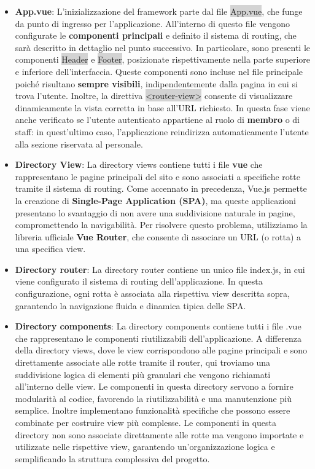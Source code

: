\begin{itemize}
	
	\item \textbf{App.vue}: L’inizializzazione del framework parte dal file \colorbox{lightgray}{App.vue}, che funge da punto di ingresso per l’applicazione. All’interno di questo file vengono configurate le \textbf{componenti principali} e definito il sistema di routing, che sarà descritto in dettaglio nel punto successivo.
	In particolare, sono presenti le componenti \colorbox{lightgray}{Header} e \colorbox{lightgray}{Footer}, posizionate rispettivamente nella parte superiore e inferiore dell’interfaccia.
	Queste componenti sono incluse nel file principale poiché risultano \textbf{sempre visibili}, indipendentemente dalla pagina in cui si trova l’utente. Inoltre, la direttiva \colorbox{lightgray}{<router-view>} consente di visualizzare dinamicamente la vista corretta in base all’URL richiesto.
	In questa fase viene anche verificato se l’utente autenticato appartiene al ruolo di \textbf{membro} o di {staff}: in quest’ultimo caso, l’applicazione reindirizza automaticamente l’utente alla sezione riservata al personale.
	
	\item \textbf{Directory View}: La directory views contiene tutti i file \textbf{vue} che rappresentano le pagine principali del sito e sono associati a specifiche rotte tramite il sistema di routing.
	Come accennato in precedenza, Vue.js permette la creazione di \textbf{Single-Page Application (SPA)}, ma queste applicazioni presentano lo svantaggio di non avere una suddivisione naturale in pagine, compromettendo la navigabilità. Per risolvere questo problema, utilizziamo la libreria ufficiale \textbf{Vue Router}, che consente di associare un URL (o rotta) a una specifica view.
	
	\item \textbf{Directory router}: La directory router contiene un unico file index.js, in cui viene configurato il sistema di routing dell’applicazione. In questa configurazione, ogni rotta è associata alla rispettiva view descritta sopra, garantendo la navigazione fluida e dinamica tipica delle SPA.
	
	\item \textbf{Directory components}: La directory components contiene tutti i file .vue che rappresentano le componenti riutilizzabili dell’applicazione. A differenza della directory views,
	dove le view corrispondono alle pagine principali e sono direttamente associate alle rotte
	tramite il router, qui troviamo una suddivisione logica di elementi più granulari che vengono richiamati all’interno delle view. Le componenti in questa directory servono a fornire
	modularità al codice, favorendo la riutilizzabilità e una manutenzione più semplice. Inoltre
	implementano funzionalità specifiche che possono essere combinate per costruire view più
	complesse. Le componenti in questa directory non sono associate direttamente alle rotte
	ma vengono importate e utilizzate nelle rispettive view, garantendo un’organizzazione
	logica e semplificando la struttura complessiva del progetto.
	

\end{itemize}
